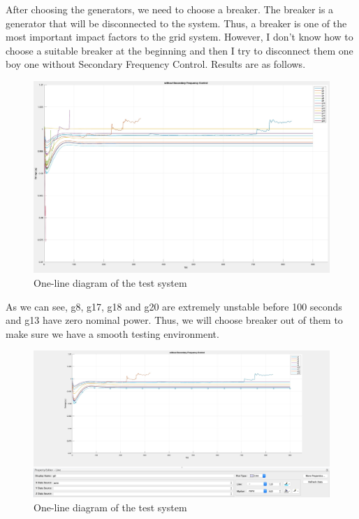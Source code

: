 \documentclass{report}
\begin{document}
After choosing the generators, we need to choose a breaker. The breaker is a generator that will be disconnected to the system. Thus, a breaker is one of the most important impact factors to the grid system. However, I don’t know how to choose a suitable breaker at the beginning and then I try to disconnect them one boy one without Secondary Frequency Control. Results are as follows.\\

\begin{figure}[htbp]
\centering
\includegraphics[width = .891\textwidth]{figure/4_1_1_without1.jpeg}
\caption{One-line diagram of the test system}
\label{4_1_1_without1}
\end{figure}

As we can see, g8, g17, g18 and g20 are extremely unstable before 100 seconds and g13 have zero nominal power. Thus, we will choose breaker out of them to make sure we have a smooth testing environment.\\


\begin{figure}[htbp]
\centering
\includegraphics[width = .891\textwidth]{figure/4_1_1_without2.jpeg}
\caption{One-line diagram of the test system}
\label{4_1_1_without2}
\end{figure}
\end{document}
